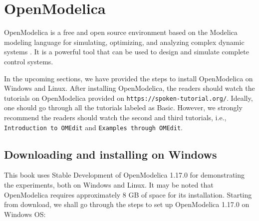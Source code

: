 


\section{OpenModelica}
\label{sec:OpenModelica-start}
OpenModelica is a free and open source environment based on the Modelica modeling language 
for simulating, optimizing, and analyzing complex dynamic systems \cite{om-ref}.
It is a powerful tool that can be used to design and simulate complete control systems. 

In the upcoming sections, we have provided the steps to install OpenModelica on Windows and Linux. 
After installing OpenModelica, the readers should watch the tutorials on OpenModelica provided on 
{\tt https://spoken-tutorial.org/}. Ideally, one should go through all the tutorials labeled as Basic. 
However, we strongly recommend the readers should watch the second and third tutorials, i.e., 
{\tt Introduction to OMEdit} and {\tt Examples through OMEdit}.


\subsection{Downloading and installing on Windows} \label{openmodelica-install-windows}
This book uses Stable Development of OpenModelica 1.17.0 for demonstrating 
the experiments, both on Windows and Linux. It may be noted that 
OpenModelica requires approximately 8 GB of space for its installation. 
Starting from download, we shall go through the steps to set up OpenModelica 
1.17.0 on Windows OS:

